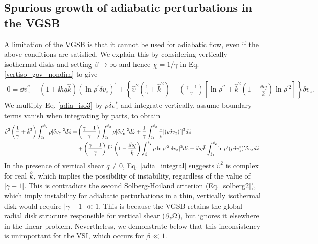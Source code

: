 \subsection{Spurious growth of adiabatic perturbations in the VGSB}\label{analytic_adia} 
A limitation of the VGSB is that it cannot be used for 
adiabatic flow, even if the above conditions are satisfied. We explain this by considering vertically isothermal
disks and setting  $\beta\to\infty$ and hence $\chi = 1/\gamma$ in 
Eq. \ref{vertiso_gov_nondim} %
to give 
\begin{align}
  0 =\dd v_z^{\prime\prime} + \left(1 + \ii h q
    \hat{k}\right)\left(\ln\rho^{\prime}\delta v_z\right)^\prime
  +\left\{\hat{\upsilon}^2\left(\frac{1}{\gamma}+\hat{k}^2\right) 
    -\left(\frac{\gamma-1}{\gamma}\right)\left[\ln\rho^{\prime\prime}+\hat{k}^2\left(1-\frac{\ii h  
          q}{\hat{k}}\right)\ln\rho^{\prime 2}\right]\right\}\delta v_z.\label{adia_iso3}
\end{align}
We multiply Eq. \ref{adia_iso3} by $\rho\delta v_z^*$ and
integrate vertically, assume boundary terms vanish when integrating by
parts, to obtain
\begin{align}
  \hat{\upsilon}^2\left(\frac{1}{\gamma} +
    \hat{k}^2\right)\int_{\hat{z}_1}^{\hat{z}_2}\rho|\delta
  v_z|^2 d\hat{z} 
  =&  \left(\frac{\gamma-1}{\gamma}\right)
  \int_{\hat{z}_1}^{\hat{z}_2}\rho|\delta v_z^\prime|^2 d\hat{z}
  +\frac{1}{\gamma}\int_{\hat{z}_1}^{\hat{z}_2}\frac{1}{\rho}|(\rho\delta
  v_z)^\prime|^2 d\hat{z}\notag\\
&+
  \left(\frac{\gamma-1}{\gamma}\right)\hat{k}^2\left(1-\frac{\mathrm{i} h
      q}{\hat{k}}\right) \int_{\hat{z}_1}^{\hat{z}_2}\rho\ln\rho^{\prime
    2}|\delta v_z|^2 d\hat{z}
+ \mathrm{i} h q \hat{k}
  \int_{\hat{z}_1}^{\hat{z}_2}\ln\rho^\prime(\rho\delta v_z^*)^\prime
  \delta v_z d\hat{z}.\label{adia_integral}
\end{align}
In the presence of vertical shear $q\neq0$, Eq. \ref{adia_integral}
suggests $\hat{\upsilon}^2$ is complex for real $\hat{k}$, which implies the
possibility of instability, regardless of the value of
$|\gamma-1|$. This is contradicts the second Solberg-Hoiland criterion 
(Eq. \ref{solberg2}), which imply instability for adiabatic
perturbations in a thin, vertically isothermal disk would require 
$|\gamma-1|\ll1$. 
This is because the VGSB retains the global radial
disk structure responsible for vertical shear
($\partial_z\Omega$), but ignores it elsewhere in the linear problem. 
Nevertheless, we demonstrate below
that this inconsistency is unimportant for the VSI, which occurs 
for $\beta\ll1$.   %

